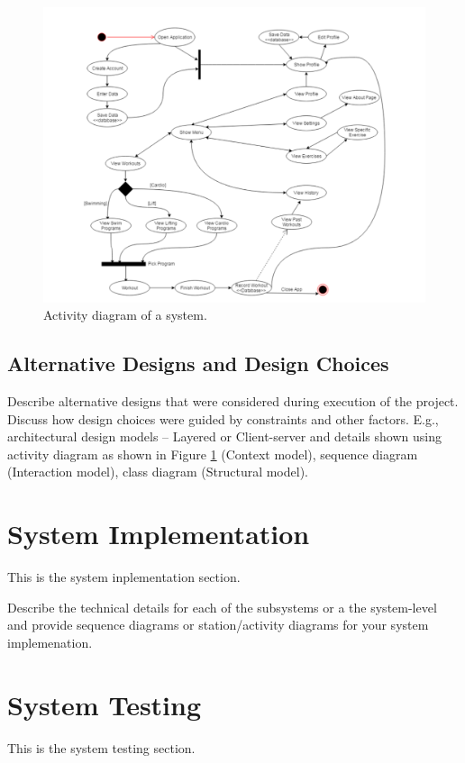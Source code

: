 \documentclass{article}
\begin{document}
\begin{figure}[!t]\centering
\includegraphics[width=5.0in]{./Figure/ativity.pdf}
\caption{Activity diagram of a system.}\label{fig:act_dia_1}
\end{figure}

\subsection{Alternative Designs and Design Choices}
Describe alternative designs that were considered during execution of the project. Discuss how design choices were guided by constraints and other factors. E.g., architectural design models – Layered or Client-server and details shown using activity diagram as shown in Figure \ref{fig:act_dia_1} (Context model), sequence diagram (Interaction model), class diagram (Structural model).



\section{System Implementation}
This is the system inplementation section.

Describe the technical details for each of the subsystems or a the system-level and
provide sequence diagrams or station/activity diagrams for your system implemenation.



\section{System Testing}
This is the system testing section.
\end{document}
